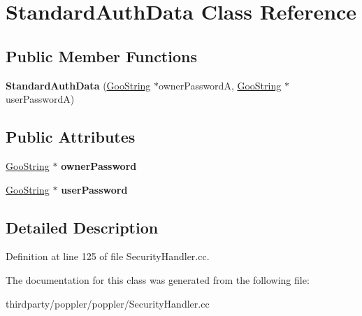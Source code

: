 \hypertarget{class_standard_auth_data}{}\section{Standard\+Auth\+Data Class Reference}
\label{class_standard_auth_data}
\subsection*{Public Member Functions}
\begin{DoxyCompactItemize}
\item 
\mbox{\label{class_standard_auth_data_aa9d861b1e76b387c6f431f2def11eecb}} 
{\bfseries Standard\+Auth\+Data} (\hyperlink{class_goo_string}{Goo\+String} $\ast$owner\+PasswordA, \hyperlink{class_goo_string}{Goo\+String} $\ast$user\+PasswordA)
\end{DoxyCompactItemize}
\subsection*{Public Attributes}
\begin{DoxyCompactItemize}
\item 
\mbox{\label{class_standard_auth_data_a31e6f7949ee1a9d39b62353ed8788a51}} 
\hyperlink{class_goo_string}{Goo\+String} $\ast$ {\bfseries owner\+Password}
\item 
\mbox{\label{class_standard_auth_data_a15fa6ef296a7212d677d105d7f1ca36a}} 
\hyperlink{class_goo_string}{Goo\+String} $\ast$ {\bfseries user\+Password}
\end{DoxyCompactItemize}


\subsection{Detailed Description}


Definition at line 125 of file Security\+Handler.\+cc.



The documentation for this class was generated from the following file\+:\begin{DoxyCompactItemize}
\item 
thirdparty/poppler/poppler/Security\+Handler.\+cc\end{DoxyCompactItemize}
